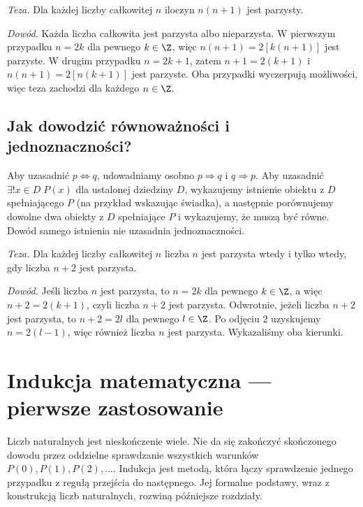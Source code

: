 \begin{przyklad}
\emph{Teza.} Dla każdej liczby całkowitej $n$
iloczyn $n(n+1)$ jest parzysty.

\emph{Dowód.} Każda liczba całkowita jest parzysta
albo nieparzysta. W pierwszym przypadku $n=2k$
dla pewnego $k\in\Z$, więc
$n(n+1)=2[k(n+1)]$ jest parzyste. W drugim
przypadku $n=2k+1$, zatem $n+1=2(k+1)$
i $n(n+1)=2[n(k+1)]$ jest parzyste.
Oba przypadki wyczerpują możliwości, więc
teza zachodzi dla każdego $n\in\Z$.
\end{przyklad}

\subsection{Jak dowodzić równoważności i jednoznaczności?}
\label{sec:proof-biconditional}
Aby uzasadnić $p\Leftrightarrow q$, udowadniamy
osobno $p\Rightarrow q$ i $q\Rightarrow p$.
Aby uzasadnić $\exists!x\in D\;P(x)$ dla ustalonej
dziedziny $D$, wykazujemy istnienie obiektu z $D$
spełniającego $P$ (na przykład wskazując świadka),
a następnie porównujemy dowolne dwa obiekty z $D$
spełniające $P$ i wykazujemy, że muszą być równe.
Dowód samego istnienia nie uzasadnia jednoznaczności.

\begin{przyklad}
\emph{Teza.} Dla każdej liczby całkowitej $n$
liczba $n$ jest parzysta wtedy i tylko wtedy,
gdy liczba $n+2$ jest parzysta.

\emph{Dowód.} Jeśli liczba $n$ jest parzysta, to $n=2k$
dla pewnego $k\in\Z$, a więc $n+2=2(k+1)$,
czyli liczba $n+2$ jest parzysta. Odwrotnie,
jeżeli liczba $n+2$ jest parzysta, to $n+2=2l$
dla pewnego $l\in\Z$. Po odjęciu $2$
uzyskujemy $n=2(l-1)$, więc również liczba $n$
jest parzysta. Wykazaliśmy oba kierunki.
\end{przyklad}

\section{Indukcja matematyczna --- pierwsze zastosowanie}
\label{sec:induction}
Liczb naturalnych jest nieskończenie wiele.
Nie da się zakończyć skończonego dowodu przez oddzielne
sprawdzanie wszystkich warunków $P(0),P(1),P(2),\ldots$.
Indukcja jest metodą,
która łączy sprawdzenie jednego przypadku z
regułą przejścia do następnego. Jej formalne
podstawy, wraz z konstrukcją liczb naturalnych,
rozwiną późniejsze rozdziały.


